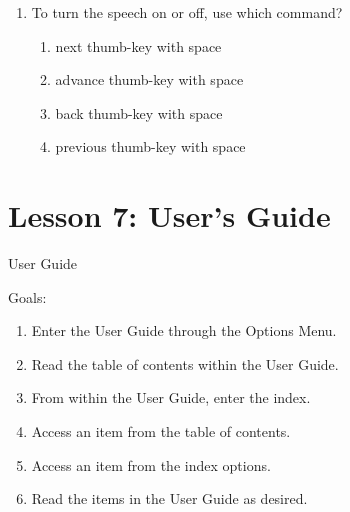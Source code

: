 \documentclass[10pt,letterpaper,twoside]{report}
\begin{document}
{{{{\begin{enumerate}
\begin{enumerate}
		      \item advance
		            
		      \item enter
		            
		      \item both a and b
		            
		            
	      \end{enumerate}
	\item To turn the speech on or off, use which command?
	      
	      \begin{enumerate}
		      \item next thumb-key with space
		            
		      \item advance thumb-key with space
		            
		      \item back thumb-key with space
		            
		      \item previous thumb-key with space
	      \end{enumerate}
\end{enumerate}

\section*{Lesson 7: User's Guide}
User Guide



Goals:



\begin{enumerate}
	\item Enter the User Guide through the Options Menu.
	      
	\item Read the table of contents within the User Guide.
	      
	\item From within the User Guide, enter the index.
	      
	\item Access an item from the table of contents.
	      
	\item Access an item from the index options.
	      
	\item Read the items in the User Guide as desired.
	      

\end{enumerate}}}}}
\end{document}
